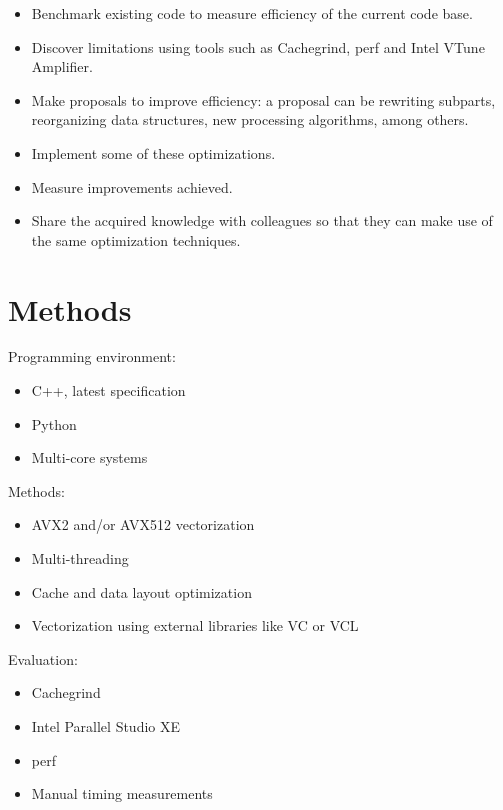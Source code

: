 \documentclass[12pt]{article}
\begin{document}
	\begin{itemize}
		\item Benchmark existing code to measure efficiency of the current code base.
		\item Discover limitations using tools such as Cachegrind, perf and Intel VTune Amplifier.
		\item Make proposals to improve efficiency: a proposal can be rewriting subparts, reorganizing data structures, new processing algorithms, among others.
		\item Implement some of these optimizations.
		\item Measure improvements achieved.
		\item Share the acquired knowledge with colleagues so that they can make use of the same optimization techniques.
	\end{itemize}	
		

	\newpage
	\section{Methods}
	
	Programming environment:
	\begin{itemize}
		\item C++, latest specification
		\item Python
		\item Multi-core systems
	\end{itemize}

	Methods:
	\begin{itemize}
		\item AVX2 and/or AVX512 vectorization
		\item Multi-threading
		\item Cache and data layout optimization
		\item Vectorization using external libraries like VC or VCL
	\end{itemize}

	Evaluation:
	\begin{itemize}
		\item Cachegrind
		\item Intel Parallel Studio XE
		\item perf
		\item Manual timing measurements
	\end{itemize}
\end{document}
